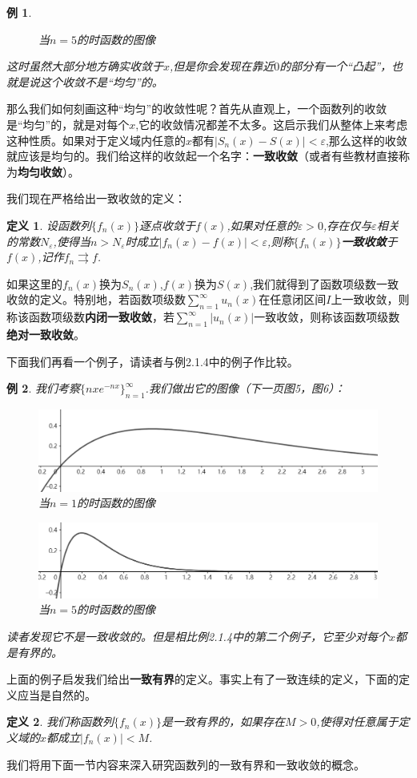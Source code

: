 \documentclass{article}
\newtheorem{definition}{定义}[subsection]
\newtheorem{example}{例}[subsection]
\begin{document}
\begin{example}
\begin{figure}[htbp]
    \caption{当$n=5$的时函数的图像}
\end{figure}
这时虽然大部分地方确实收敛于$x$,但是你会发现在靠近$0$的部分有一个“凸起”，也就是说这个收敛不是“均匀”的。
\end{example}
那么我们如何刻画这种“均匀”的收敛性呢？首先从直观上，一个函数列的收敛是“均匀”的，就是对每个$x$,它的收敛情况都差不太多。这启示我们从整体上来考虑这种性质。如果对于定义域内任意的$x$都有$|S_n(x)-S(x)|<\varepsilon$,那么这样的收敛就应该是均匀的。我们给这样的收敛起一个名字：\textbf{一致收敛}（或者有些教材直接称为\textbf{均匀收敛}）。\par
我们现在严格给出一致收敛的定义：
\begin{definition}
设函数列$\{f_n(x)\}$逐点收敛于$f(x)$,如果对任意的$\varepsilon>0$,存在仅与$\varepsilon$相关的常数$N_\varepsilon$,使得当$n>N_\varepsilon$时成立$|f_n(x)-f(x)|<\varepsilon$,则称$\{f_n(x)\}$\textbf{一致收敛}于$f(x)$,记作$f_n\rightrightarrows f$.
\end{definition}
如果这里的$f_n(x)$换为$S_n(x)$,$f(x)$换为$S(x)$,我们就得到了函数项级数一致收敛的定义。特别地，若函数项级数$\sum_{n=1}^\infty u_n(x)$在任意闭区间$I$上一致收敛，则称该函数项级数\textbf{内闭一致收敛}，若$\sum_{n=1}^\infty|u_n(x)|$一致收敛，则称该函数项级数\textbf{绝对一致收敛}。\par
下面我们再看一个例子，请读者与例2.1.4中的例子作比较。
\begin{example}
我们考察$\{nxe^{-nx}\}_{n=1}^\infty$.我们做出它的图像（下一页图5，图6）：\par
\begin{figure}[htbp]
    \center
    \includegraphics[scale=0.25]{picture/image5.png}
    \caption{当$n=1$的时函数的图像}
\end{figure}
\begin{figure}[htbp]
    \center
    \includegraphics[scale=0.25]{picture/image6.png}
    \caption{当$n=5$的时函数的图像}
\end{figure}
读者发现它不是一致收敛的。但是相比例2.1.4中的第二个例子，它至少对每个$x$都是有界的。
\end{example}
上面的例子启发我们给出\textbf{一致有界}的定义。事实上有了一致连续的定义，下面的定义应当是自然的。
\begin{definition}
我们称函数列$\{f_n(x)\}$是一致有界的，如果存在$M>0$,使得对任意属于定义域的$x$都成立$|f_n(x)|<M$.
\end{definition}
我们将用下面一节内容来深入研究函数列的一致有界和一致收敛的概念。
\end{document}

